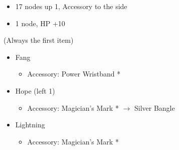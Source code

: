\begin{menu}
\begin{multicols}{2}
\begin{itemize}
\begin{itemize}
\begin{itemize}
            \begin{itemize}
                \item 17 nodes up 1, Accessory to the side
                \item 1 node, HP +10
            \end{itemize}
        \end{itemize}
    \end{itemize}
    \columnbreak
    \equip (Always the first item)
    \begin{itemize}
        \item Fang
        \begin{itemize}
                \item Accessory: Power Wristband *
        \end{itemize}
        \item Hope (left 1)
        \begin{itemize}
                \item Accessory:  Magician's Mark * $\rightarrow$ Silver Bangle
        \end{itemize}
        \item Lightning
        \begin{itemize}
                \item Accessory: Magician's Mark *
        \end{itemize}
    \end{itemize}
\end{itemize}
\end{multicols}
\end{menu}

\renewcommand{\first}{[1] Aggression (\com/\com/\rav)}
\renewcommand{\second}{[2] Relentless Assault (\com/\rav/\rav)}
\renewcommand{\third}{[3] Smart Bomb (\sab/\rav/\rav)}
\renewcommand{\fourth}{[4] Mystic Tower (\sen/\rav/\rav)}
\renewcommand{\fifth}{[5] Guerilla (\sab/\rav/\syn)}
\renewcommand{\sixth}{[6] Relentless Assault (\com/\rav/\rav)}

